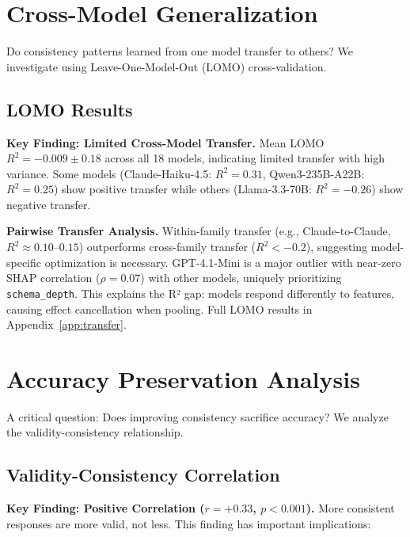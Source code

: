 \documentclass[sigconf,anonymous,review]{acmart}
\begin{document}
\section{Cross-Model Generalization}
\label{sec:crossmodel}

Do consistency patterns learned from one model transfer to others? We investigate using Leave-One-Model-Out (LOMO) cross-validation.

\subsection{LOMO Results}

\textbf{Key Finding: Limited Cross-Model Transfer.} Mean LOMO $R^2 = -0.009 \pm 0.18$ across all 18 models, indicating limited transfer with high variance. Some models (Claude-Haiku-4.5: $R^2 = 0.31$, Qwen3-235B-A22B: $R^2 = 0.25$) show positive transfer while others (Llama-3.3-70B: $R^2 = -0.26$) show negative transfer.

\textbf{Pairwise Transfer Analysis.} Within-family transfer (e.g., Claude-to-Claude, $R^2 \approx 0.10$--$0.15$) outperforms cross-family transfer ($R^2 < -0.2$), suggesting model-specific optimization is necessary. GPT-4.1-Mini is a major outlier with near-zero SHAP correlation ($\rho = 0.07$) with other models, uniquely prioritizing \texttt{schema\_depth}. This explains the R² gap: models respond differently to features, causing effect cancellation when pooling. Full LOMO results in Appendix~\ref{app:transfer}.

\section{Accuracy Preservation Analysis}
\label{sec:accuracy}

A critical question: Does improving consistency sacrifice accuracy? We analyze the validity-consistency relationship.

\subsection{Validity-Consistency Correlation}

\textbf{Key Finding: Positive Correlation ($r = +0.33$, $p < 0.001$).} More consistent responses are more valid, not less. This finding has important implications:
\end{document}
